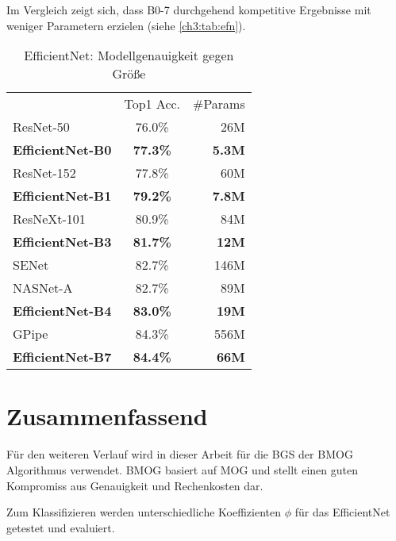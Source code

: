 Im Vergleich zeigt sich, dass B0-7 durchgehend kompetitive Ergebnisse mit weniger Parametern erzielen (siehe \autoref{ch3:tab:efn}).

\begin{table}[ht]
    \centering
    \begin{tabular}[b]{l|cr}
    & Top1 Acc. & \#Params  \\
    \shline
    ResNet-50 \cite{he_deep_2015} & 76.0\% & 26M \\
    \bf EfficientNet-B0 & \bf 77.3\% & \bf 5.3M \\
    \hline
    ResNet-152 \cite{he_deep_2015} & 77.8\%  & 60M \\
    \bf EfficientNet-B1 & \bf 79.2\%  & \bf 7.8M \\
    \hline
    ResNeXt-101 \cite{xie_aggregated_2016}         &  80.9\% & 84M \\
    \bf EfficientNet-B3                                    & \bf 81.7\%  & \bf 12M \\
    \hline
    SENet  \cite{hu_squeeze-and-excitation_2018}                       &  82.7\% & 146M \\
    NASNet-A \cite{zoph_learning_2018}     & 82.7\% & 89M \\
    \bf EfficientNet-B4                                    & \bf 83.0\% & \bf 19M \\
    \hline
    GPipe \cite{huang_gpipe:_2019}  &  84.3\% & 556M \\
    \bf EfficientNet-B7                                    & \bf 84.4\% & \bf 66M \\
    \end{tabular}
    \caption{EfficientNet: Modellgenauigkeit gegen Größe \cite{tan_efficientnet:_2019}}
    \label{ch3:tab:efn}
\end{table}


\section*{Zusammenfassend}
Für den weiteren Verlauf wird in dieser Arbeit für die \ac{BGS} der \ac{BMOG} Algorithmus verwendet.
\ac{BMOG} basiert auf \ac{MOG} und stellt einen guten Kompromiss aus Genauigkeit und Rechenkosten dar.

Zum Klassifizieren werden unterschiedliche Koeffizienten $\phi$ für das EfficientNet getestet und evaluiert.